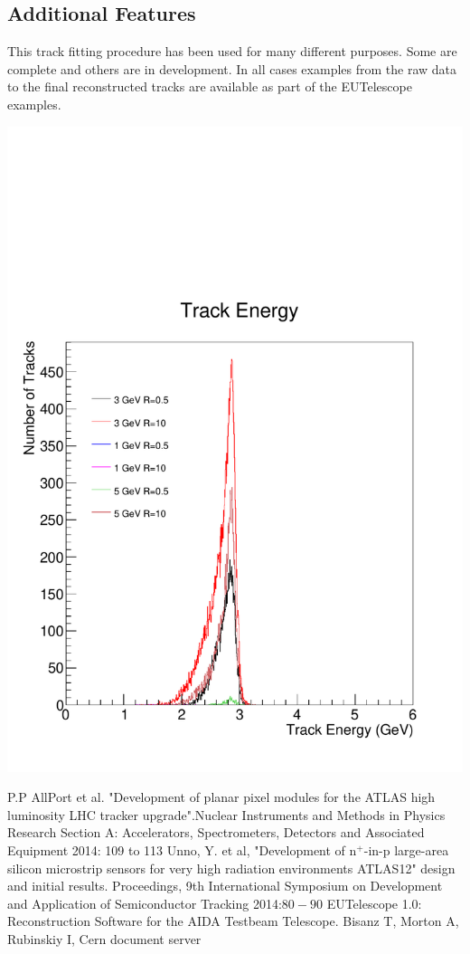 \documentclass[a0,portrait]{a0poster}
\begin{document}
\begin{multicols}{2}
\section*{Additional Features}
This track fitting procedure has been used for many different purposes. Some are complete and others are in development. In all cases examples from the raw data to the final reconstructed tracks are available as part of the EUTelescope examples. 
\begin{center}
\includegraphics[width=0.6\linewidth]{figures/beamE3B1.pdf}
\label{trine}
\end{center}

\begin{thebibliography}{9}
	 P.P AllPort et al. "Development of planar pixel modules for the ATLAS high luminosity LHC tracker upgrade".Nuclear Instruments and Methods in Physics Research Section A: Accelerators, Spectrometers, Detectors and Associated Equipment 2014: 109 to 113
	 Unno, Y. et al, "Development of n$^+$-in-p large-area silicon microstrip sensors for very high radiation environments  ATLAS12" design and initial results. Proceedings, 9th International Symposium on Development and Application of Semiconductor Tracking 2014:$80-90$ 
 EUTelescope 1.0: Reconstruction Software for the AIDA Testbeam Telescope. Bisanz T, Morton A, Rubinskiy I, Cern document server


\end{thebibliography}
\end{multicols}
\end{document}
